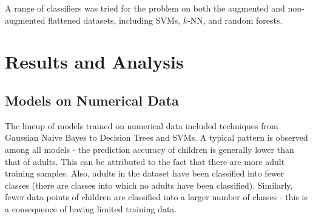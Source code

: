 \documentclass[10pt,twocolumn,letterpaper]{article}
\begin{document}
A range of classifiers was tried for the problem on both the augmented and non-augmented flattened datasets, including SVMs, $k$-NN, and random forests.

\section{Results and Analysis}
\subsection*{Models on Numerical Data}
The lineup of models trained on numerical data included techniques from Gaussian Naive Bayes to Decision Trees and SVMs. A typical pattern is observed among all models - the prediction accuracy of children is generally lower than that of adults. This can be attributed to the fact that there are more adult training samples. Also, adults in the dataset have been classified into fewer classes (there are classes into which no adults have been classified). Similarly, fewer data points of children are classified into a larger number of classes - this is a consequence of having limited training data.
\end{document}
